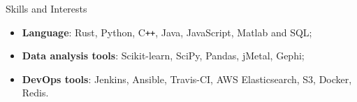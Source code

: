 \documentclass{resume} %
\newenvironment{myitemize}
{ \begin{itemize}[leftmargin=0.2em,label={}]
    \setlength{\itemsep}{0pt}
    \setlength{\parskip}{0pt}
    \setlength{\parsep}{0pt}     }
{ \end{itemize}                  }
\begin{document}
\begin{rSection}{Skills and Interests}
\begin{myitemize}\setlength\itemsep{0.1em}
    \item \textbf{Language}: Rust, Python, C\texttt{++}, Java, JavaScript, Matlab and SQL;
    \item \textbf{Data analysis tools}: Scikit-learn, SciPy, Pandas, jMetal, Gephi;
    \item \textbf{DevOps tools}: Jenkins, Ansible, Travis-CI, AWS Elasticsearch, S3, Docker, Redis.
\end{myitemize}


\end{rSection}

\end{document}
